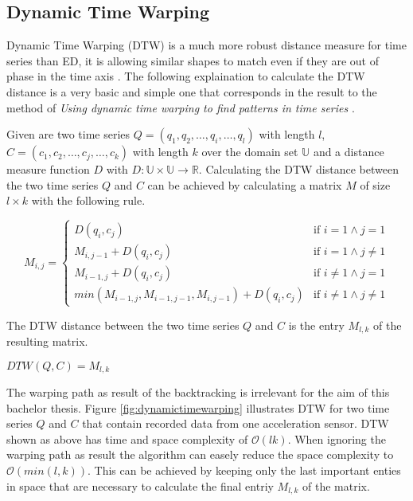 \subsection{Dynamic Time Warping} \label{dynamic_time_warping}
Dynamic Time Warping (DTW) is a much more robust distance measure for time series than ED, it is allowing
similar shapes to match even if they are out of phase in the time axis \cite{keogh2002exact}. The following explaination
to calculate the DTW distance is a very basic and simple one that corresponds in the result to the method of
\textit{Using dynamic time warping to find patterns in time series} \cite{berndt1994using}.

Given are two time series $Q = (q_1, q_2, \dots, q_i, \dots, q_l)$ with length
$l$, $C = (c_1, c_2, \dots, c_j, \dots, c_k)$ with length $k$ over the domain set $\mathbb{U}$ and a distance measure
function $D$ with $D: \mathbb{U} \times \mathbb{U} \to \mathbb{R}$. Calculating the DTW distance between the two time
series $Q$ and $C$ can be achieved by calculating a matrix $M$ of size $l \times k$ with the following rule.
\begin{center} \[ M_{i, j} = \begin{cases}
    D(q_i,c_j) & \text{if } i = 1 \wedge j = 1\\
    M_{i,j-1} + D(q_i,c_j) & \text{if } i = 1 \wedge j \neq 1\\
    M_{i-1,j} + D(q_i,c_j) & \text{if } i \neq 1 \wedge j = 1\\
    min(M_{i-1,j}, M_{i-1,j-1}, M_{i,j-1}) + D(q_i,c_j) & \text{if } i \neq 1 \wedge j \neq 1
\end{cases} \] \end{center}
The DTW distance between the two time series $Q$ and $C$ is the entry $M_{l,k}$ of the resulting matrix.
\begin{center}
    $DTW(Q, C) = M_{l,k}$
\end{center}
The warping path as result of the backtracking is irrelevant for the aim of this bachelor thesis. Figure
\ref{fig:dynamictimewarping} illustrates DTW for two time series $Q$ and $C$ that contain recorded data from one
acceleration sensor. DTW shown as above has time and space complexity of $\mathcal{O}(lk)$. When ignoring the
warping path as result the algorithm can easely reduce the space complexity to $\mathcal{O}(min(l, k))$. This can be
achieved by keeping only the last important enties in space that are necessary to calculate the final entriy $M_{l,k}$
of the matrix.

